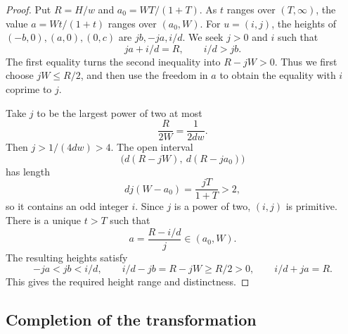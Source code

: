 \begin{proof}
Put $R=H/w$ and $a_0=WT/(1+T)$.  As $t$ ranges over $(T,\infty)$,
the value $a=Wt/(1+t)$ ranges over $(a_0,W)$.
For $u=(i,j)$, the heights of $(-b,0),(a,0),(0,c)$ are $jb,-ja,i/d$.
We seek $j>0$ and $i$ such that
\[
 ja+i/d=R,\qquad i/d>jb.
\]
The first equality turns the second inequality into $R-jW>0$.
Thus we first choose $jW\le R/2$, and then use the freedom in $a$ to
obtain the equality with $i$ coprime to $j$.

Take $j$ to be the largest power of two at most
\[
 \frac{R}{2W}=\frac{1}{2dw}.
\]
Then $j>1/(4dw)>4$.  The open interval
\[
 \bigl(d(R-jW),\ d(R-ja_0)\bigr)
\]
has length
\[
 dj(W-a_0)=\frac{jT}{1+T}>2,
\]
so it contains an odd integer $i$.  Since $j$ is a power of two, $(i,j)$
is primitive.  There is a unique $t>T$ such that
\[
 a=\frac{R-i/d}{j}\in(a_0,W).
\]
The resulting heights satisfy
\[
 -ja<jb<i/d,\qquad
 i/d-jb=R-jW\ge R/2>0,\qquad i/d+ja=R.
\]
This gives the required height range and distinctness.
\end{proof}

\subsection{Completion of the transformation}

